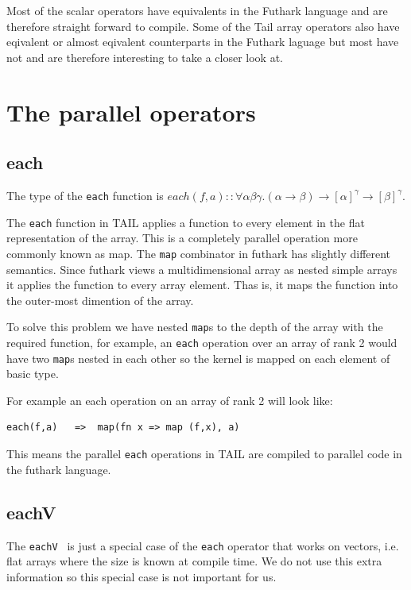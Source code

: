 \documentclass[11pt]{article}
\begin{document}
Most of the scalar operators have equivalents in the Futhark language and are therefore straight forward to compile. Some of the Tail array operators also have eqivalent or almost eqivalent counterparts in the Futhark laguage but most have not and are therefore interesting to take a closer look at.


\section{The parallel operators}

\subsection{each}

The type of the {\tt each} function is $each(f,a) :: \forall\alpha\beta\gamma.(\alpha \to \beta) \to [\alpha]^\gamma \to [\beta]^\gamma$.

The {\tt each} function in TAIL applies a function to every element in the flat representation of the array. This is a completely parallel operation more commonly known as map. The {\tt map} combinator in futhark has slightly different semantics.
Since futhark views a multidimensional array as nested simple arrays it applies the function to every array element.
Thas is, it maps the function into the outer-most dimention of the array.

To solve this problem we have nested {\tt map}s to the depth of the array with the required function, for example, an {\tt each} operation over an array of rank 2 would have two {\tt map}s nested in each other so the kernel is mapped on each element of basic type.

For example an each operation on an array of rank 2 will look like:
\begin{lstlisting}[numbers=none,frame=none]
each(f,a)	=>	map(fn x => map (f,x), a)
\end{lstlisting}

This means the parallel {\tt each} operations in TAIL are compiled to parallel code in the futhark language.

\subsection{eachV}
The {\tt eachV } is just a special case of the {\tt each} operator that works on vectors, i.e. flat arrays where the size
is known at compile time. We do not use this extra information so this special case is not important for us.
\end{document}
